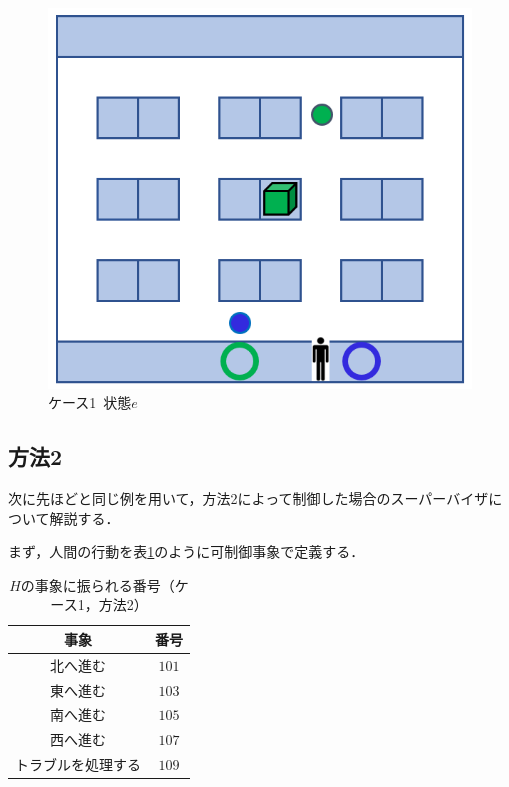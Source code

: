 \begin{figure}[!t]
    \centering
    \includegraphics[scale=0.32]{figures/HITL1_case1_e.png}
    \caption{ケース1\ 状態$e$}
    \label{fig:HITL1_case1_e}
\end{figure}



\subsection{方法2}
次に先ほどと同じ例を用いて，方法2によって制御した場合のスーパーバイザについて解説する．

まず，人間の行動を表\ref{tb:event_numbers_human2}のように可制御事象で定義する．

\begin{table}[htb]
    \centering
    \begin{tabular}{|c|c|} \hline
        事象 & 番号 \\ \hline
        北へ進む & $101$ \\
        東へ進む & $103$ \\
        南へ進む & $105$ \\
        西へ進む & $107$ \\ 
        トラブルを処理する & $109$ \\ \hline
    \end{tabular}
    \caption{$H$の事象に振られる番号（ケース1，方法2）}
    \label{tb:event_numbers_human2}
\end{table}

